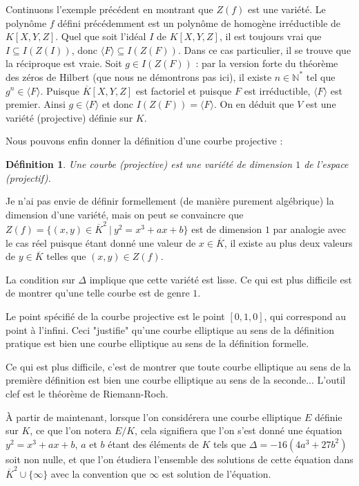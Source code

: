 \documentclass{article}
\theoremstyle{plain}%
\newtheorem{deff}[thm]{Définition}
\theoremstyle{definition}%
\newcommand{\N}{\mathbb{N}}
\newcommand{\ol}{\overline}
\begin{document}
Continuons l'exemple précédent en montrant que $Z(f)$ est une variété.
  Le polynôme $f$ défini précédemment est un polynôme de homogène irréductible de $K[X, Y, Z]$.   
  Quel que soit l'idéal $I$ de $K[X, Y, Z]$, il est toujours vrai que $I \subseteq I(Z(I))$, donc $\langle F \rangle \subseteq I(Z( F ))$. 
  Dans ce cas particulier, il se trouve que la réciproque est vraie. Soit $g\in I(Z(F))$ : par la version forte du théorème des zéros de Hilbert (que nous ne démontrons pas ici), il existe $n\in\N^*$ tel que $g^n\in \langle F \rangle$.
  Puisque $\ol K[X, Y, Z]$ est factoriel et puisque $F$ est irréductible,  $\langle F \rangle$ est premier. Ainsi $g\in \langle F \rangle$ et donc $I(Z(F)) = \langle F \rangle$.
  On en déduit que $V$ est une variété (projective) définie sur $K$.

  Nous pouvons enfin donner la définition d'une courbe projective :

\begin{deff}
  Une courbe (projective) est une variété de dimension $1$ de l'espace (projectif).
\end{deff}


Je n'ai pas envie de définir formellement (de manière purement algébrique) la dimension d'une variété, mais on peut se convaincre que $Z(f) = \{(x, y)\in \ol K^2\ |\ y^2 = x^3 + ax + b\}$ est de dimension $1$ par analogie avec le cas réel puisque étant donné une valeur de $x\in\ol K$, il existe au plus deux valeurs de $y\in\ol K$ telles que $(x, y)\in Z(f)$. 


La condition sur $\Delta$ implique que cette variété est lisse. Ce qui est plus difficile est de montrer  qu'une telle courbe est de genre $1$. 

Le point spécifié de la courbe projective est le point $[0, 1, 0]$, qui correspond au point à l'infini. Ceci "justifie" qu'une courbe elliptique au sens de la définition pratique est bien une courbe elliptique au sens de la définition formelle. 

Ce qui est plus difficile, c'est de montrer que toute courbe elliptique au sens de la première définition est bien une courbe elliptique au sens de la seconde... L'outil clef est le théorème de Riemann-Roch.

\vspace{0.5em}
À partir de maintenant, lorsque l'on considérera une courbe elliptique $E$ définie sur $K$, ce que l'on notera $E/K$, cela signifiera que l'on s'est donné une équation $y^2 = x^3 + ax + b$, $a$ et $b$ étant des éléments de $K$ tels que $\Delta =-16(4a^3+ 27b^2)$ soit non nulle, et que l'on étudiera l'ensemble des solutions de cette équation dans $\ol K^2\cup \{\infty\}$ avec la convention que $\infty$ est solution de l'équation.
\end{document}
